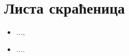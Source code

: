 \chapter*{Листа скраћеница}

\begin{itemize}
\item{\textit{...}},
\item{\textit{...}}.
\end{itemize}





